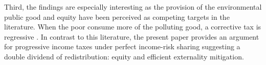 Third, the findings are especially interesting as the provision of the environmental public good and equity have been perceived as competing targets in the literature. When the poor consume more of the polluting good, a corrective tax is regressive \citep{ Fried2018TheGenerations, Sager2019IncomeCurves}. %
In contrast to this literature, the present paper provides an argument for progressive income taxes under perfect income-risk sharing suggesting a double dividend of redistribution: equity and efficient externality mitigation. %
